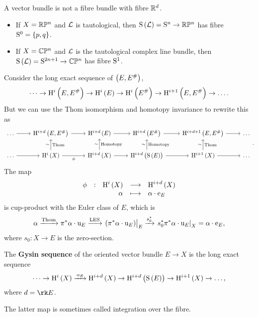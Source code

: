 \pagebreak

\begin{remark*}
A vector bundle is not a fibre bundle with fibre $ \RR^d $.
\end{remark*}

\begin{example*}
\hfill
\begin{itemize}
\item If $ X = \RR\PP^n $ and $ \LLL $ is tautological, then $ \S\br{\LLL} = \S^n \to \RR\PP^n $ has fibre $ \S^0 = \cbr{p, q} $.
\item If $ X = \CC\PP^n $ and $ \LLL $ is the tautological complex line bundle, then $ \S\br{\LLL} = \S^{2n + 1} \to \CC\PP^n $ has fibre $ \S^1 $.
\end{itemize}
\end{example*}

Consider the long exact sequence of $ \br{E, E^\#} $,
$$ \dots \to \H^i\br{E, E^\#} \to \H^i\br{E} \to \H^i\br{E^\#} \to \H^{i + 1}\br{E, E^\#} \to \dots. $$
But we can use the Thom isomorphism and homotopy invariance to rewrite this as
$$
\begin{tikzcd}
\dots \arrow{r} & \H^{i + d}\br{E, E^\#} \arrow{r} & \H^{i + d}\br{E} \arrow{r} & \H^{i + d}\br{E^\#} \arrow{r} & \H^{i + d + 1}\br{E, E^\#} \arrow{r} & \dots \\
\dots \arrow{r} & \H^i\br{X} \arrow{u}{\sim}[swap]{\text{Thom}} \arrow{r}[swap]{\phi} & \H^{i + d}\br{X} \arrow{u}{\sim}[swap]{\text{Homotopy}} \arrow{r} & \H^{i + d}\br{\S\br{E}} \arrow{u}{\sim}[swap]{\text{Homotopy}} \arrow{r} & \H^{i + 1}\br{X} \arrow{u}{\sim}[swap]{\text{Thom}} \arrow{r} & \dots
\end{tikzcd}.
$$
The map
$$ \function[\phi]{\H^i\br{X}}{\H^{i + d}\br{X}}{\alpha}{\alpha \cdot \e_E} $$
is cup-product with the Euler class of $ E $, which is
$$ \alpha \xrightarrow{\text{Thom}} \pi^*\alpha \cdot \u_E \xrightarrow{\text{LES}} \eval{\br{\pi^*\alpha \cdot \u_E}}_E \xrightarrow{s_0^*} \eval{s_0^*\pi^*\alpha \cdot \u_E}_X = \alpha \cdot \e_E, $$
where $ s_0 : X \to E $ is the zero-section.

\begin{definition*}
The \textbf{Gysin sequence} of the oriented vector bundle $ E \to X $ is the long exact sequence
$$ \dots \to \H^i\br{X} \xrightarrow{\cdot \e_E} \H^{i + d}\br{X} \to \H^{i + d}\br{\S\br{E}} \to \H^{i + 1}\br{X} \to \dots, $$
where $ d = \rk E $.
\end{definition*}

The latter map is sometimes called integration over the fibre.

